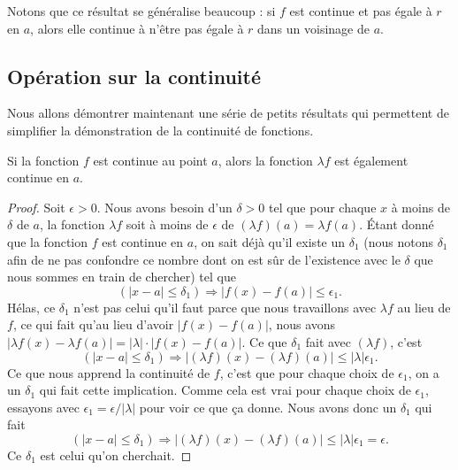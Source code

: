 Notons que ce résultat se généralise beaucoup : si \( f\) est continue et pas égale à \( r\) en \( a\), alors elle continue à n'être pas égale à \( r\) dans un voisinage de \( a\).

\subsection{Opération sur la continuité}

Nous allons démontrer maintenant une série de petits résultats qui permettent de simplifier la démonstration de la continuité de fonctions.
\begin{theorem}
	Si la fonction $f$ est continue au point $a$, alors la fonction $\lambda f$ est également continue en $a$.
\end{theorem}

\begin{proof}
	Soit $\epsilon>0$. Nous avons besoin d'un $\delta>0$ tel que pour chaque $x$ à moins de $\delta$ de $a$, la fonction $\lambda f$ soit à moins de $\epsilon$ de $(\lambda f)(a)=\lambda f(a)$. Étant donné que la fonction $f$ est continue en $a$, on sait déjà qu'il existe un $\delta_1$ (nous notons $\delta_1$ afin de ne pas confondre ce nombre dont on est sûr de l'existence avec le $\delta$ que nous sommes en train de chercher) tel que
	\[
		(| x-a |\leq \delta_1)\Rightarrow | f(x)-f(a) |\leq \epsilon_1.
	\]
	Hélas, ce $\delta_1$ n'est pas celui qu'il faut parce que nous travaillons avec $\lambda f$ au lieu de $f$, ce qui fait qu'au lieu d'avoir $| f(x)-f(a) |$, nous avons $| \lambda f(x)-\lambda f(a) |=| \lambda |\cdot | f(x)-f(a) |$.  Ce que $\delta_1$ fait avec $(\lambda f)$, c'est
	\[
		(| x-a |\leq\delta_1)\Rightarrow  | (\lambda f)(x)- (\lambda f)(a)|\leq | \lambda |\epsilon_1.
	\]
	Ce que nous apprend la continuité de $f$, c'est que pour chaque choix de $\epsilon_1$, on a un $\delta_1$ qui fait cette implication. Comme cela est vrai pour chaque choix de $\epsilon_1$, essayons avec $\epsilon_1=\epsilon/| \lambda |$ pour voir ce que ça donne. Nous avons donc un $\delta_1$ qui fait
	\[
		(| x-a |\leq\delta_1)\Rightarrow  | (\lambda f)(x)- (\lambda f)(a)|\leq | \lambda |\epsilon_1=\epsilon.
	\]
	Ce $\delta_1$ est celui qu'on cherchait.
\end{proof}

